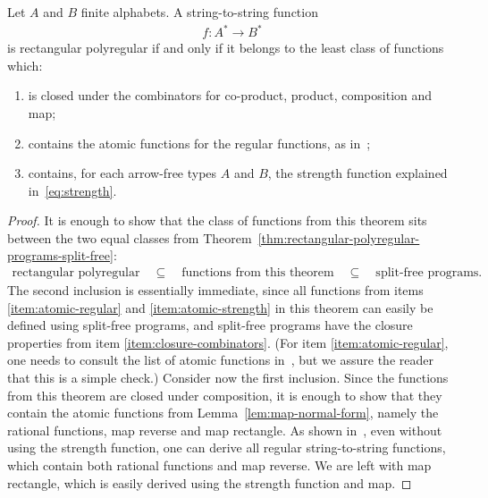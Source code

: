 \begin{theorem}
    Let $A$ and $B$ finite alphabets. A string-to-string function
    \begin{align*}
    f : A^* \to B^*
    \end{align*}
    is rectangular polyregular if and only if it belongs to the least class of functions which:
    \begin{enumerate}
        \item \label{item:closure-combinators} is closed under the combinators for co-product, product, composition and map;
        \item \label{item:atomic-regular} contains the atomic functions for the regular functions, as  in~\cite[Section 6]{bojanczykRegularFirstOrderList2018};
        \item \label{item:atomic-strength} contains, for each arrow-free types $A$ and $B$, the strength function explained in~\eqref{eq:strength}.
        
    \end{enumerate}
\end{theorem}
\begin{proof}
    It is enough to show that the class of functions from this theorem sits between the two equal classes from 
    Theorem~\ref{thm:rectangular-polyregular-programs-split-free}:
    \begin{align*}
        \text{rectangular polyregular} 
    \quad \subseteq \quad
    \text{functions from this theorem}
    \quad \subseteq \quad
    \text{split-free programs}.
    \end{align*}
    The second inclusion is essentially immediate, since all functions from items \ref{item:atomic-regular} and \ref{item:atomic-strength} in this theorem can easily be defined using split-free programs, and split-free programs have the closure properties from item \ref{item:closure-combinators}. (For item \ref{item:atomic-regular}, one needs to consult the list of atomic functions in~\cite{bojanczykRegularFirstOrderList2018}, but we assure the reader that this is a simple check.) 
    Consider now the first inclusion. Since the functions from this theorem are closed under composition, it is enough to show that they contain the atomic functions from Lemma~\ref{lem:map-normal-form}, namely the rational functions, map reverse and map rectangle. As shown in~\cite[Theorem 6.1]{bojanczykRegularFirstOrderList2018}, even without using the strength function, one can derive all regular string-to-string  functions, which contain both rational functions and map reverse. We are left with map rectangle, which is easily derived using the strength function and map.
\end{proof}

